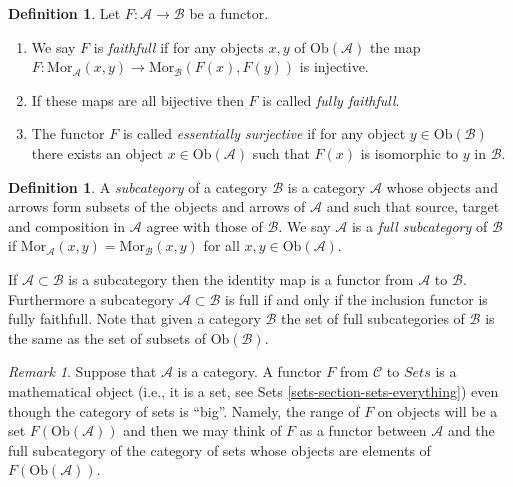 \documentclass{amsart}
\theoremstyle{definition}
\newtheorem{definition}[theorem]{Definition}
\theoremstyle{remark}
\newtheorem{remark}[theorem]{Remark}
\numberwithin{equation}{subsection}
\begin{document}
\begin{definition}
\label{definition-faithfull}
Let $F : \mathcal{A} \to \mathcal{B}$ be a functor.
\begin{enumerate}
\item We say $F$ is {\it faithfull} if 
for any objects $x,y$ of $\text{Ob}(\mathcal{A})$ the map
$F : \text{Mor}_\mathcal{A}(x,y) \to \text{Mor}_\mathcal{B}(F(x), F(y))$
is injective.
\item If these maps are all bijective then $F$ is called
{\it fully faithfull}.
\item
The functor $F$ is called {\it essentially surjective} if for any 
object $y \in \text{Ob}(\mathcal{B})$ there exists an object
$x \in \text{Ob}(\mathcal{A})$ such that $F(x)$ is isomorphic to $y$ in
$\mathcal{B}$.
\end{enumerate}
\end{definition}

\begin{definition}
\label{definition-subcategory}
A {\it subcategory} of a category $\mathcal{B}$ is
a category $\mathcal{A}$ whose objects and arrows
form subsets of the objects and arrows
of $\mathcal{A}$ and such that source, target
and composition in $\mathcal{A}$ agree with those
of $\mathcal{B}$. We say $\mathcal{A}$ is a
{\it full subcategory} of $\mathcal{B}$ if $\text{Mor}_{\mathcal{A}}(x,y)
= \text{Mor}_{\mathcal{B}}(x,y)$ for all $x,y \in \text{Ob}(\mathcal{A})$.
\end{definition}

\noindent
If $\mathcal{A} \subset \mathcal{B}$ is a subcategory then the
identity map is a functor from $\mathcal{A}$ to $\mathcal{B}$.
Furthermore a subcategory $\mathcal{A} \subset \mathcal{B}$
is full if and only if the inclusion functor is fully faithfull.
Note that given a category $\mathcal{B}$ the set of full subcategories
of $\mathcal{B}$ is the same as the set of subsets of
$\text{Ob}(\mathcal{B})$.

\begin{remark} 
\label{remark-functor-into-sets}
Suppose that $\mathcal{A}$ is a category.
A functor $F$ from $\mathcal{C}$ to $\textit{Sets}$
is a mathematical object (i.e., it is a set, see
Sets \autoref{sets-section-sets-everything})
even though the category of sets is ``big''.
Namely, the range of $F$ on objects will be 
a set $F(\text{Ob}(\mathcal{A}))$ and then we 
may think of $F$ as a functor between 
$\mathcal{A}$ and the full subcategory
of the category of sets whose
objects are elements of $F(\text{Ob}(\mathcal{A}))$.
\end{remark}
\end{document}
